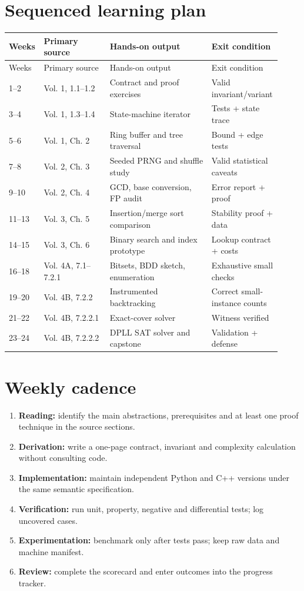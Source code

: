 \documentclass[11pt,letterpaper]{article}
\begin{document}
\section{Sequenced learning plan}
\small
\begin{longtable}{@{}p{0.11\linewidth}p{0.24\linewidth}>{\raggedright\arraybackslash}p{0.37\linewidth}>{\raggedright\arraybackslash}p{0.20\linewidth}@{}}
\toprule Weeks & Primary source & Hands-on output & Exit condition\\\midrule\endfirsthead
\toprule Weeks & Primary source & Hands-on output & Exit condition\\\midrule\endhead
1--2 & Vol. 1, 1.1--1.2 & Contract and proof exercises & Valid invariant/variant\\
3--4 & Vol. 1, 1.3--1.4 & State-machine iterator & Tests + state trace\\
5--6 & Vol. 1, Ch. 2 & Ring buffer and tree traversal & Bound + edge tests\\
7--8 & Vol. 2, Ch. 3 & Seeded PRNG and shuffle study & Valid statistical caveats\\
9--10 & Vol. 2, Ch. 4 & GCD, base conversion, FP audit & Error report + proof\\
11--13 & Vol. 3, Ch. 5 & Insertion/merge sort comparison & Stability proof + data\\
14--15 & Vol. 3, Ch. 6 & Binary search and index prototype & Lookup contract + costs\\
16--18 & Vol. 4A, 7.1--7.2.1 & Bitsets, BDD sketch, enumeration & Exhaustive small checks\\
19--20 & Vol. 4B, 7.2.2 & Instrumented backtracking & Correct small-instance counts\\
21--22 & Vol. 4B, 7.2.2.1 & Exact-cover solver & Witness verified\\
23--24 & Vol. 4B, 7.2.2.2 & DPLL SAT solver and capstone & Validation + defense\\
\bottomrule\end{longtable}
\normalsize
\section{Weekly cadence}
\begin{enumerate}\item \textbf{Reading:} identify the main abstractions, prerequisites and at least one proof technique in the source sections.
\item \textbf{Derivation:} write a one-page contract, invariant and complexity calculation without consulting code.
\item \textbf{Implementation:} maintain independent Python and C++ versions under the same semantic specification.
\item \textbf{Verification:} run unit, property, negative and differential tests; log uncovered cases.
\item \textbf{Experimentation:} benchmark only after tests pass; keep raw data and machine manifest.
\item \textbf{Review:} complete the scorecard and enter outcomes into the progress tracker.
\end{enumerate}
\end{document}
